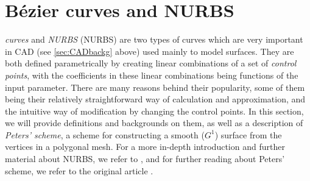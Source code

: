 \section{B{\'e}zier curves and \acs{NURBS}}
\label{sec:NURBS}


\emph{\Bez curves} and \emph{\acl{NURBS}} (\acs{NURBS}) are two types of curves which are very important in CAD (see \autoref{sec:CADbackg} above) used mainly to model surfaces. They are both defined parametrically by creating linear combinations of a set of \emph{control points}, with the coefficients in these linear combinations being functions of the input parameter. There are many reasons behind their popularity, some of them being their relatively straightforward way of calculation and approximation, and the intuitive way of modification by changing the control points. In this section, we will provide definitions and backgrounds on them, as well as a description of \emph{Peters' scheme}, a scheme for constructing a smooth ($G^1$) surface from the vertices in a polygonal mesh. For a  more in-depth introduction and further material about NURBS, we refer to \cite{farin2002handbook}, and for further reading about Peters' scheme, we refer to the original article \cite{peters1992constructing}.


%
%